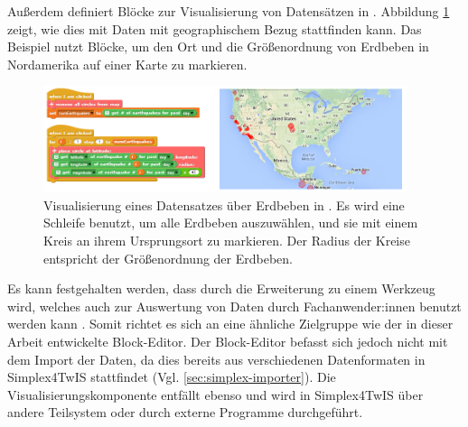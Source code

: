 Außerdem definiert \DataSnap{} Blöcke zur Visualisierung von Datensätzen in \Snap{} \parencite{hellmannDataSnapEnabling2015}. Abbildung \ref{fig:datasnap-visualization} zeigt, wie dies mit Daten mit geographischem Bezug stattfinden kann. Das Beispiel nutzt Blöcke, um den Ort und die Größenordnung von Erdbeben in Nordamerika auf einer Karte zu markieren.

\begin{figure}[!ht]
  \centering
  \includegraphics[width=0.95\textwidth]{assets/datasnap-visualization.png}
  \caption[Visualisierung eines Datensatzes über Erdbeben in \Snap{}]{Visualisierung eines Datensatzes über Erdbeben in \DataSnap{}. Es wird eine Schleife benutzt, um alle Erdbeben auszuwählen, und sie mit einem Kreis an ihrem Ursprungsort zu markieren. Der Radius der Kreise entspricht der Größenordnung der Erdbeben.\\\parencite[28]{hellmannDataSnapEnabling2015}}
  \label{fig:datasnap-visualization}
\end{figure}

Es kann festgehalten werden, dass \Snap{} durch die Erweiterung \DataSnap{} zu einem Werkzeug wird, welches auch zur Auswertung von Daten durch Fachanwender:innen benutzt werden kann \parencite{hellmannDataSnapEnabling2015}. Somit richtet es sich an eine ähnliche Zielgruppe wie der in dieser Arbeit entwickelte Block-Editor. Der Block-Editor befasst sich jedoch nicht mit dem Import der Daten, da dies bereits aus verschiedenen Datenformaten in Simplex4TwIS stattfindet (Vgl. \ref{sec:simplex-importer}). Die Visualisierungskomponente entfällt ebenso und wird in Simplex4TwIS über andere Teilsystem oder durch externe Programme durchgeführt.
